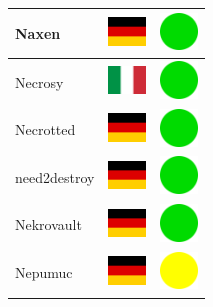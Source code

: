 \documentclass[12pt, a4paper, twoside]{report}
\begin{document}
\begin{center}
\begin{longtable}{|p{5cm}|p{2cm}|p{2cm}|}
Naxen & \includegraphics[width=1cm]{4x3/de} & \includegraphics[width=1cm]{likes/y} \\ \hline
Necrosy & \includegraphics[width=1cm]{4x3/it} & \includegraphics[width=1cm]{likes/y} \\ \hline
Necrotted & \includegraphics[width=1cm]{4x3/de} & \includegraphics[width=1cm]{likes/y} \\ \hline
need2destroy & \includegraphics[width=1cm]{4x3/de} & \includegraphics[width=1cm]{likes/y} \\ \hline
Nekrovault & \includegraphics[width=1cm]{4x3/de} & \includegraphics[width=1cm]{likes/y} \\ \hline
Nepumuc & \includegraphics[width=1cm]{4x3/de} & \includegraphics[width=1cm]{likes/m} \\ \hline

\end{longtable}
\end{center}
\end{document}
